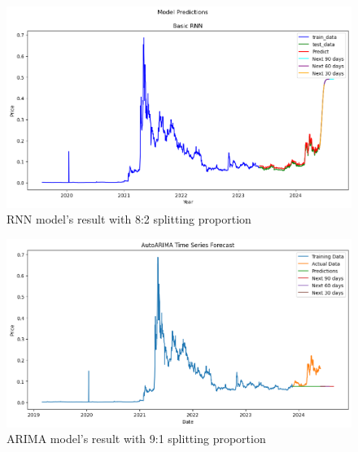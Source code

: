 \documentclass{ieeeojies}
\begin{document}
\begin{figure}[H]
  \centering
  \begin{minipage}{0.8\linewidth}
    \centering
    \includegraphics[width=\linewidth]{Image/RNN/RNN_Dogecoin82.png}
    \caption{RNN model's result with 8:2 splitting proportion}
    \label{fig:27}
  \end{minipage}
\end{figure}
\vspace{-5mm}
\begin{figure}[H]
  \centering
  \begin{minipage}{0.8\linewidth}
    \centering
    \includegraphics[width=\linewidth]{Image/Arima/Arima_doge_9_1_n.png}
    \caption{ARIMA model's result with 9:1 splitting proportion}
    \label{fig:28}
  \end{minipage}
\end{figure}
\vspace{-5mm}
\end{document}
